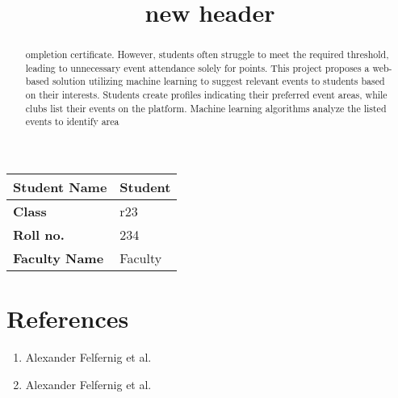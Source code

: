 \documentclass{article}
\title{new header}
\date{}
\begin{document}
    \maketitle

    \begin{table}[h!]
    \centering
    \begin{tabular}{|p{4cm}|p{10cm}|}
        \hline
        \textbf{Student Name} & Student \\ \hline
        \textbf{Class} & r23 \\ \hline
        \textbf{Roll no.} & 234 \\ \hline
        \textbf{Faculty Name} & Faculty \\ \hline
    \end{tabular}
    \label{tab:faculty_student_details}
    \end{table}

    \begin{abstract}
    ompletion certificate. However, students often struggle to meet the required threshold, leading to unnecessary event attendance solely for points. This project proposes a web-based solution utilizing machine learning to suggest relevant events to students based on their interests. Students create profiles indicating their preferred event areas, while clubs list their events on the platform. Machine learning algorithms analyze the listed events to identify area
    \end{abstract}

    \section*{References}

    \begin{enumerate}
        \item Alexander Felfernig et al.
        
        \item Alexander Felfernig et al.
        
        
         
    \end{enumerate}

    
\end{document}
